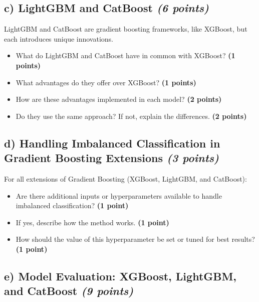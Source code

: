 \documentclass[
  letterpaper,
  DIV=11,
  numbers=noendperiod]{scrreprt}
\providecommand{\tightlist}{%
  \setlength{\itemsep}{0pt}\setlength{\parskip}{0pt}}\usepackage{longtable,booktabs,array}
\begin{document}
\subsection{\texorpdfstring{c) LightGBM and CatBoost \emph{(6
points)}}{c) LightGBM and CatBoost (6 points)}}\label{c-lightgbm-and-catboost-6-points}

LightGBM and CatBoost are gradient boosting frameworks, like XGBoost,
but each introduces unique innovations.

\begin{itemize}
\tightlist
\item
  What do LightGBM and CatBoost have in common with XGBoost? \textbf{(1
  points)}\\
\item
  What advantages do they offer over XGBoost? \textbf{(1 points)}\\
\item
  How are these advantages implemented in each model? \textbf{(2
  points)}\\
\item
  Do they use the same approach? If not, explain the differences.
  \textbf{(2 points)}
\end{itemize}

\subsection{\texorpdfstring{d) Handling Imbalanced Classification in
Gradient Boosting Extensions \emph{(3
points)}}{d) Handling Imbalanced Classification in Gradient Boosting Extensions (3 points)}}\label{d-handling-imbalanced-classification-in-gradient-boosting-extensions-3-points}

For all extensions of Gradient Boosting (XGBoost, LightGBM, and
CatBoost):

\begin{itemize}
\tightlist
\item
  Are there additional inputs or hyperparameters available to handle
  imbalanced classification? \textbf{(1 point)}\\
\item
  If yes, describe how the method works. \textbf{(1 point)}\\
\item
  How should the value of this hyperparameter be set or tuned for best
  results? \textbf{(1 point)}
\end{itemize}

\subsection{\texorpdfstring{e) Model Evaluation: XGBoost, LightGBM, and
CatBoost \emph{(9
points)}}{e) Model Evaluation: XGBoost, LightGBM, and CatBoost (9 points)}}\label{e-model-evaluation-xgboost-lightgbm-and-catboost-9-points}
\end{document}
